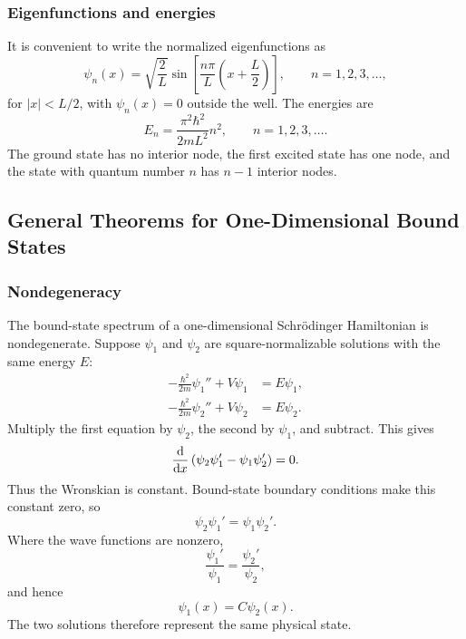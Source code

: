 \subsubsection{Eigenfunctions and energies}
It is convenient to write the normalized eigenfunctions as
\begin{equation}
 \boxed{
 \psi_n(x)=\sqrt{\frac{2}{L}}
 \sin\!\left[\frac{n\pi}{L}\left(x+\frac{L}{2}\right)\right],
 \qquad n=1,2,3,\ldots,}
\end{equation}
for $|x|<L/2$, with $\psi_n(x)=0$ outside the well. The energies are
\begin{equation}
 \boxed{E_n=\frac{\pi^2\hbar^2}{2mL^2}n^2,
 \qquad n=1,2,3,\ldots.}
\end{equation}
The ground state has no interior node, the first excited state has one node,
and the state with quantum number $n$ has $n-1$ interior nodes.

\subsection{General Theorems for One-Dimensional Bound States}

\subsubsection{Nondegeneracy}
The bound-state spectrum of a one-dimensional Schr\"odinger Hamiltonian is
nondegenerate. Suppose $\psi_1$ and $\psi_2$ are square-normalizable
solutions with the same energy $E$:
\begin{align}
 -\frac{\hbar^2}{2m}\psi_1''+V\psi_1&=E\psi_1,\\
 -\frac{\hbar^2}{2m}\psi_2''+V\psi_2&=E\psi_2.
\end{align}
Multiply the first equation by $\psi_2$, the second by $\psi_1$, and
subtract. This gives
\begin{equation}
 \frac{\mathrm{d}{}}{\mathrm{d} x}\left(\psi_2\psi_1'-\psi_1\psi_2'\right)=0.
\end{equation}
Thus the Wronskian is constant. Bound-state boundary conditions make this
constant zero, so
\begin{equation}
 \psi_2\psi_1'=\psi_1\psi_2'.
\end{equation}
Where the wave functions are nonzero,
\begin{equation}
 \frac{\psi_1'}{\psi_1}=\frac{\psi_2'}{\psi_2},
\end{equation}
and hence
\begin{equation}
 \psi_1(x)=C\psi_2(x).
\end{equation}
The two solutions therefore represent the same physical state.


